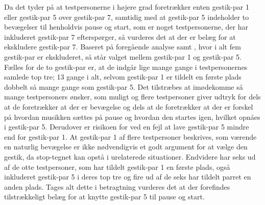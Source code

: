 Da det tyder på at testpersonerne i højere grad foretrækker enten gestik-par 1 eller gestik-par 5 over gestik-par 7, samtidig med at gestik-par 5 indeholder to bevægelser til henholdvis pause og start, som er noget testpersonerne, der har inkluderet gestik-par 7 efterspørger, så vurderes det at der er belæg for at ekskludere gestik-par 7. \blankline
%
Baseret på foregående analyse samt , hvor i alt fem gestik-par er ekskluderet, så står valget mellem gestik-par 1 og gestik-par 5. Fælles for de to gestik-par er, at de indgår lige mange gange i testpersonernes samlede top tre; 13 gange i alt, selvom gestik-par 1 er tildelt en første plads dobbelt så mange gange som gestik-par 5. Det tilstræbes at imødekomme så mange testpersoners ønsker, som muligt og flere testpersoner giver udtryk for dels at de foretrækker at der er bevægelse og dels at de foretrækker at der er forskel på hvordan musikken sættes på pause og hvordan den startes igen, hvilket opnåes i gestik-par 5. Derudover er risikoen for ved en fejl at lave gestik-par 5 mindre end for gestik-par 1. At gestik-par 1 af flere testpersoner beskrives, som værende en naturlig bevægelse er ikke nødvendigvis et godt argument for at vælge den gestik, da stop-tegnet kan opstå i urelaterede situationer. Endvidere har seks ud af de otte testpersoner, som har tildelt gestik-par 1 en første plads, også inkluderet gestik-par 5 i deres top tre og fire ud af de seks har tildelt parret en anden plads. Tages alt dette i betragtning vurderes det at der forefindes tilstrækkeligt belæg for at knytte gestik-par 5 til pause og start.            





